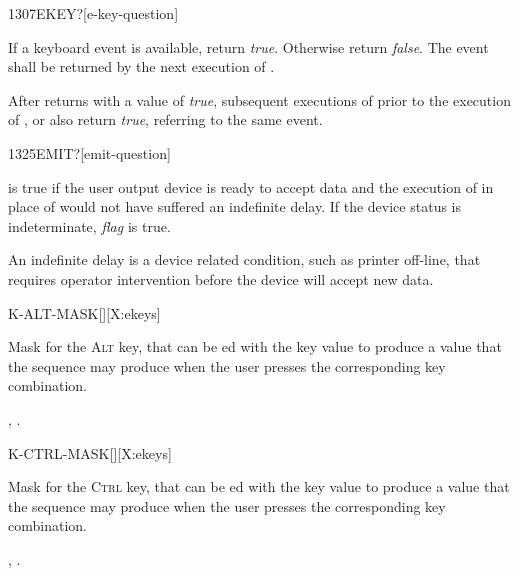 
\begin{worddef}[EKEYq]{1307}{EKEY?}[e-key-question]
\item {}

	If a keyboard event is available, return \emph{true}. Otherwise
	return \emph{false}. The event shall be returned by the next
	execution of .

	After  returns with a value of \emph{true},
	subsequent executions of  prior to the execution of
	,  or  also return
	\emph{true}, referring to the same event.
\end{worddef}


\begin{worddef}[EMITq]{1325}{EMIT?}[emit-question]
\item {}

	 is true if the user output device is ready to
	accept data and the execution of  in place of
	 would not have suffered an indefinite delay. If
	the device status is indeterminate, \emph{flag} is true.

	\begin{defer}
	\rationale %
		An indefinite delay is a device related condition, such as
		printer off-line, that requires operator intervention before
		the device will accept new data.
	\end{defer}
\end{worddef}




\begin{worddef*}{}{K-ALT-MASK}[][X:ekeys]
\item {}

	Mask for the \textsc{Alt} key, that can be ed with the
	key value to produce a value that the sequence 
	 may produce when the user presses the
	corresponding key combination.

\see {},
	.
\end{worddef*}


\begin{worddef*}{}{K-CTRL-MASK}[][X:ekeys]
\item {}

	Mask for the \textsc{Ctrl} key, that can be ed with the
	key value to produce a value that the sequence 
	 may produce when the user presses the
	corresponding key combination.

\see {},
	.
\end{worddef*}


